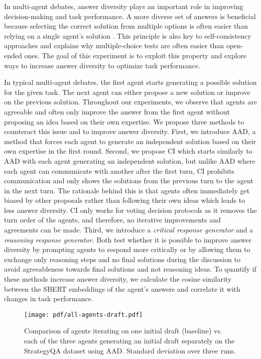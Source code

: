 In multi-agent debates, answer diversity plays an important role in improving decision-making and task performance.
A more diverse set of answers is beneficial because selecting the correct solution from multiple options is often easier than relying on a single agent's solution \citep{zheng_judging_2023}. 
This principle is also key to self-consistency approaches \citep{wang_self-consistency_2022} and explains why multiple-choice tests are often easier than open-ended ones. 
The goal of this experiment is to exploit this property and explore ways to increase answer diversity to optimize task performance.

In typical multi-agent debates, the first agent starts generating a possible solution for the given task.
The next agent can either propose a new solution or improve on the previous solution.
Throughout our experiments, we observe that agents are agreeable and often only improve the answer from the first agent without proposing an idea based on their own expertise.
We propose three methods to counteract this issue and to improve answer diversity.
First, we introduce \acf{AAD}, a method that forces each agent to generate an independent solution based on their own expertise in the first round. 
Second, we propose \acf{CI} which starts similarly to \ac{AAD} with each agent generating an independent solution, but unlike \ac{AAD} where each agent can communicate with another after the first turn, \ac{CI} prohibits communication and only shows the solutions from the previous turn to the agent in the next turn. 
The rationale behind this is that agents often immediately get biased by other proposals rather than following their own ideas which leads to less answer diversity.
\ac{CI} only works for voting decision protocols as it removes the turn order of the agents, and therefore, no iterative improvements and agreements can be made.
Third, we introduce a \textit{critical response generator} and a \textit{reasoning response generator}. 
Both test whether it is possible to improve answer diversity by prompting agents to respond more critically or by allowing them to exchange only reasoning steps and no final solutions during the discussion to avoid agreeableness towards final solutions and not reasoning ideas.
To quantify if these methods increase answer diversity, we calculate the cosine similarity between the SBERT embeddings \citep{reimers2019sentencebertsentenceembeddingsusing} of the agent's answers and correlate it with changes in task performance.


\begin{figure}[t]
    \centering
    \texttt{[image: pdf/all-agents-draft.pdf]}
    \caption{Comparison of agents iterating on one initial draft (baseline) vs. each of the three agents generating an initial draft separately on the StrategyQA dataset using \ac{AAD}. Standard deviation over three runs.
    \vspace{-0.5cm}}
    \label{fig:all_agents_draft}
\end{figure}

